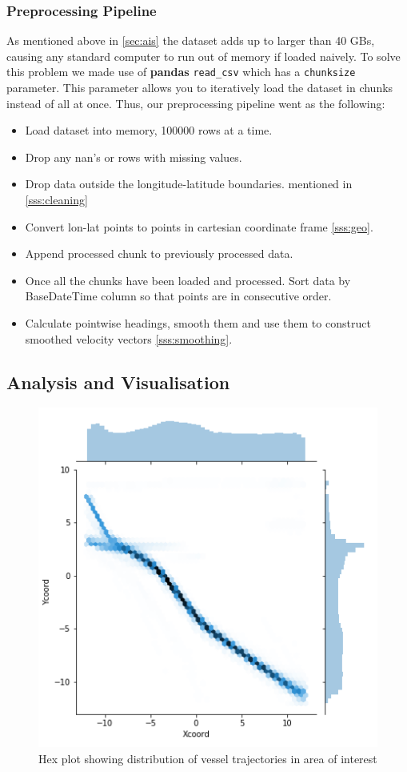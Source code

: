 \documentclass[bsc,frontabs,twoside,singlespacing,parskip,deptreport]{infthesis}     %
\begin{document}
\subsubsection{Preprocessing Pipeline}
\label{sss:pipeline}
As mentioned above in \ref{sec:ais} the dataset adds up to larger than 40 GBs, causing any standard computer to run out of memory if loaded naively. To solve this problem we made use of \textbf{pandas} \texttt{read\_csv} which has a \texttt{chunksize} parameter. This parameter allows you to iteratively load the dataset in chunks instead of all at once. Thus, our preprocessing pipeline went as the following:

\begin{itemize}
    \item Load dataset into memory, 100000 rows at a time.
    \item Drop any nan's or rows with missing values.
    \item Drop data outside the longitude-latitude boundaries. mentioned in \ref{sss:cleaning}
    \item Convert lon-lat points to points in cartesian coordinate frame \ref{sss:geo}.
    \item Append processed chunk to previously processed data.
    \item Once all the chunks have been loaded and processed. Sort data by BaseDateTime column so that points are in consecutive order.
    \item Calculate pointwise headings, smooth them and use them to construct smoothed velocity vectors \ref{sss:smoothing}.
\end{itemize}

\subsection{Analysis and Visualisation}
\begin{figure}
    \centering
    \includegraphics[scale=0.8]{report/images/latlonhex.png}
    \caption{Hex plot showing distribution of vessel trajectories in area of interest}
    \label{fig:my_label}
\end{figure}
\end{document}
